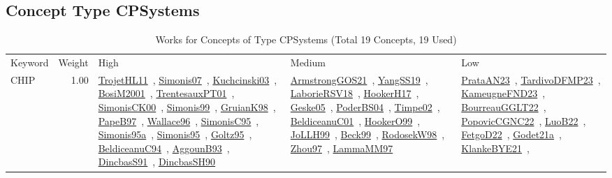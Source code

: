 \subsection{Concept Type CPSystems}
\label{sec:CPSystems}
\label{CPSystems}
{\scriptsize
\begin{longtable}{p{3cm}r>{\raggedright\arraybackslash}p{6cm}>{\raggedright\arraybackslash}p{6cm}>{\raggedright\arraybackslash}p{8cm}}
\rowcolor{white}\caption{Works for Concepts of Type CPSystems (Total 19 Concepts, 19 Used)}\\ \toprule
\rowcolor{white}Keyword & Weight & High & Medium & Low\\ \midrule\endhead
\bottomrule
\endfoot
\index{CHIP}\index{CPSystems!CHIP}CHIP &  1.00 & \href{../works/TrojetHL11.pdf}{TrojetHL11}~\cite{TrojetHL11}, \href{../works/Simonis07.pdf}{Simonis07}~\cite{Simonis07}, \href{../works/Kuchcinski03.pdf}{Kuchcinski03}~\cite{Kuchcinski03}, \href{../works/BosiM2001.pdf}{BosiM2001}~\cite{BosiM2001}, \href{../works/TrentesauxPT01.pdf}{TrentesauxPT01}~\cite{TrentesauxPT01}, \href{../works/SimonisCK00.pdf}{SimonisCK00}~\cite{SimonisCK00}, \href{../works/Simonis99.pdf}{Simonis99}~\cite{Simonis99}, \href{../works/GruianK98.pdf}{GruianK98}~\cite{GruianK98}, \href{../works/PapeB97.pdf}{PapeB97}~\cite{PapeB97}, \href{../works/Wallace96.pdf}{Wallace96}~\cite{Wallace96}, \href{../works/SimonisC95.pdf}{SimonisC95}~\cite{SimonisC95}, \href{../works/Simonis95a.pdf}{Simonis95a}~\cite{Simonis95a}, \href{../works/Simonis95.pdf}{Simonis95}~\cite{Simonis95}, \href{../works/Goltz95.pdf}{Goltz95}~\cite{Goltz95}, \href{../works/BeldiceanuC94.pdf}{BeldiceanuC94}~\cite{BeldiceanuC94}, \href{../works/AggounB93.pdf}{AggounB93}~\cite{AggounB93}, \href{../works/DincbasS91.pdf}{DincbasS91}~\cite{DincbasS91}, \href{../works/DincbasSH90.pdf}{DincbasSH90}~\cite{DincbasSH90} & \href{../works/ArmstrongGOS21.pdf}{ArmstrongGOS21}~\cite{ArmstrongGOS21}, \href{../works/YangSS19.pdf}{YangSS19}~\cite{YangSS19}, \href{../works/LaborieRSV18.pdf}{LaborieRSV18}~\cite{LaborieRSV18}, \href{../works/HookerH17.pdf}{HookerH17}~\cite{HookerH17}, \href{../works/Geske05.pdf}{Geske05}~\cite{Geske05}, \href{../works/PoderBS04.pdf}{PoderBS04}~\cite{PoderBS04}, \href{../works/Timpe02.pdf}{Timpe02}~\cite{Timpe02}, \href{../works/BeldiceanuC01.pdf}{BeldiceanuC01}~\cite{BeldiceanuC01}, \href{../works/HookerO99.pdf}{HookerO99}~\cite{HookerO99}, \href{../works/JoLLH99.pdf}{JoLLH99}~\cite{JoLLH99}, \href{../works/Beck99.pdf}{Beck99}~\cite{Beck99}, \href{../works/RodosekW98.pdf}{RodosekW98}~\cite{RodosekW98}, \href{../works/Zhou97.pdf}{Zhou97}~\cite{Zhou97}, \href{../works/LammaMM97.pdf}{LammaMM97}~\cite{LammaMM97} & \href{../works/PrataAN23.pdf}{PrataAN23}~\cite{PrataAN23}, \href{../works/TardivoDFMP23.pdf}{TardivoDFMP23}~\cite{TardivoDFMP23}, \href{../works/KameugneFND23.pdf}{KameugneFND23}~\cite{KameugneFND23}, \href{../works/BourreauGGLT22.pdf}{BourreauGGLT22}~\cite{BourreauGGLT22}, \href{../works/PopovicCGNC22.pdf}{PopovicCGNC22}~\cite{PopovicCGNC22}, \href{../works/LuoB22.pdf}{LuoB22}~\cite{LuoB22}, \href{../works/FetgoD22.pdf}{FetgoD22}~\cite{FetgoD22}, \href{../works/Godet21a.pdf}{Godet21a}~\cite{Godet21a}, \href{../works/KlankeBYE21.pdf}{KlankeBYE21}~\cite{KlankeBYE21}, 
\end{longtable}}
